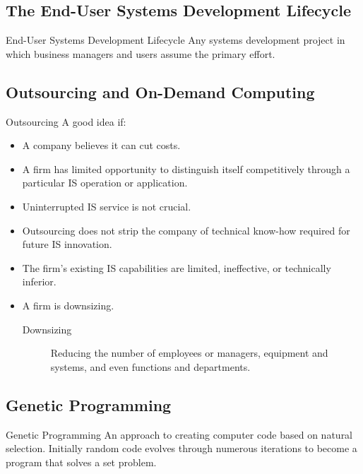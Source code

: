 \documentclass[\main/notes.tex]{subfiles}
\begin{document}
			\subsection{The End-User Systems Development Lifecycle}
				\begin{definition}{End-User Systems Development Lifecycle}
					Any systems development project in which business managers and users assume the primary effort.
				\end{definition}
			\subsection{Outsourcing and On-Demand Computing}
				\begin{sidenote}{Outsourcing}
					A good idea if:
					\begin{itemize}[nosep]
						\item A company believes it can cut costs.
						\item A firm has limited opportunity to distinguish itself competitively through a particular IS operation or application.
						\item Uninterrupted IS service is not crucial.
						\item Outsourcing does not strip the company of technical know-how required for future IS innovation.
						\item The firm's existing IS capabilities are limited, ineffective, or technically inferior.
						\item A firm is downsizing.
							\begin{description}
								\item[Downsizing] Reducing the number of employees or managers, equipment and systems, and even functions and departments. 
							\end{description}
					\end{itemize}
				\end{sidenote}
			\subsection{Genetic Programming}
				\begin{definition}{Genetic Programming}
					An approach to creating computer code based on natural selection. Initially random code evolves through numerous iterations to become a program that solves a set problem.
				\end{definition}
\end{document}
